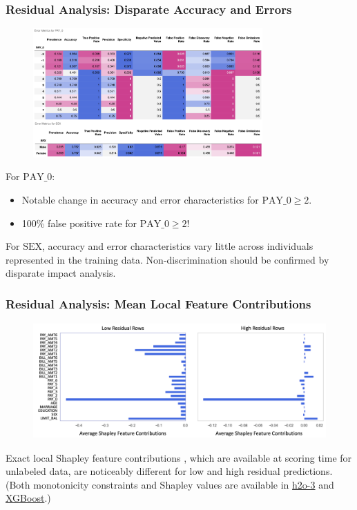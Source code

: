\documentclass[11pt,
               aspectratio=169,
               hyperref={colorlinks}
               ]{beamer}
\begin{document}
			\begin{frame}[t]
		
				\frametitle{\textbf{Residual Analysis}: Disparate Accuracy and Errors}
		
		                 \vspace{-10pt}
				\begin{figure}
					\begin{center}
						\includegraphics[height=140pt]{../img/de.png}
					\end{center}
				\end{figure}
				\vspace{-15pt}
				\tiny For $\text{PAY\_0}$:
				\begin{itemize}
					\item Notable change in accuracy and error characteristics for $\text{PAY\_0} \geq 2$. 
					\item 100\% false positive rate for $\text{PAY\_0} \geq 2$!
				\end{itemize}
				For $\text{SEX}$, accuracy and error characteristics vary little across individuals represented in the training data. Non-discrimination should be confirmed by disparate impact analysis.
		
			\end{frame}

			\begin{frame}[t]
		
				\frametitle{\textbf{Residual Analysis}: Mean Local Feature Contributions}
				\vspace{-15pt}
				\begin{figure}
					\begin{center}
						\includegraphics[height=125pt]{../img/global_high_low.png}
					\end{center}
				\end{figure}	
				\scriptsize{Exact local Shapley feature contributions \cite{shapley}, which are available at scoring time for unlabeled data, are noticeably different for low and high residual predictions. (Both monotonicity constraints and Shapley values are available in \href{https://www.github.com/h2oai/h2o-3}{h2o-3} and \href{https://www.github.com/dmlc/xgboost}{XGBoost}.)} 
		
			\end{frame}
\end{document}
